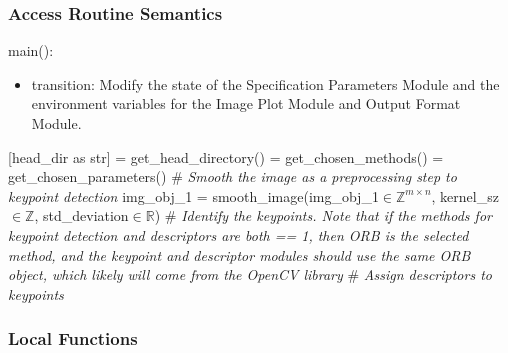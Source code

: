 \documentclass[12pt, titlepage]{article}
\begin{document}
\subsubsection{Access Routine Semantics}

\noindent main():
\begin{itemize}
\item transition: Modify the state of the Specification Parameters Module and the 
environment variables for the Image Plot Module and Output Format Module.
\end{itemize}
[head\_dir as str] = get\_head\_directory() \newline {} 
= get\_chosen\_methods() \newline {} = get\_chosen\_parameters() \newline \newline
\# \textit{Smooth the image as a preprocessing step to keypoint detection} \newline
img\_obj\_1 = smooth\_image(img\_obj\_1$ \in \mathbb{Z}^{m \times n}$, kernel\_sz$ \in \mathbb{Z}$, 
std\_deviation$ \in \mathbb{R}$) \newline \newline
\# \textit{Identify the keypoints. Note that if the methods for keypoint detection and 
descriptors are both == 1, then ORB is the selected method, and the keypoint and descriptor 
modules should use the same ORB object, which likely will come from the OpenCV library}\newline
\newline \newline
\# \textit{Assign descriptors to keypoints} \newline




\subsubsection{Local Functions}
\end{document}
